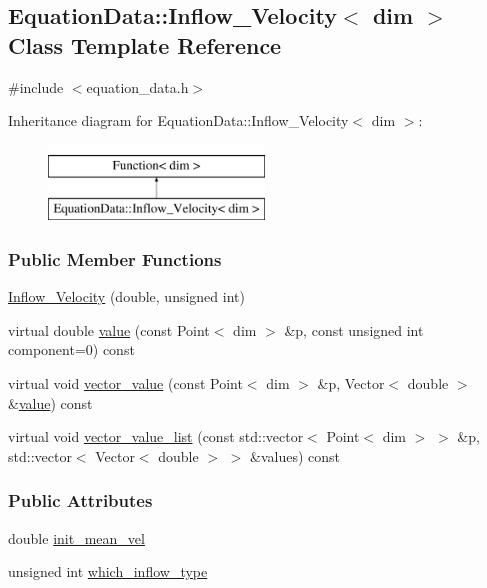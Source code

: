 \hypertarget{class_equation_data_1_1_inflow___velocity}{}\subsection{Equation\+Data\+:\+:Inflow\+\_\+\+Velocity$<$ dim $>$ Class Template Reference}
\label{class_equation_data_1_1_inflow___velocity}


{\ttfamily \#include $<$equation\+\_\+data.\+h$>$}

Inheritance diagram for Equation\+Data\+:\+:Inflow\+\_\+\+Velocity$<$ dim $>$\+:\begin{figure}[H]
\begin{center}
\leavevmode
\includegraphics[height=2.000000cm]{class_equation_data_1_1_inflow___velocity}
\end{center}
\end{figure}
\subsubsection*{Public Member Functions}
\begin{DoxyCompactItemize}
\item 
\hyperlink{class_equation_data_1_1_inflow___velocity_ac5035db1e557027579fd3b3c0220c671}{Inflow\+\_\+\+Velocity} (double, unsigned int)
\item 
virtual double \hyperlink{class_equation_data_1_1_inflow___velocity_a986662426fb6b3685ced24ce676a6ac4}{value} (const Point$<$ dim $>$ \&p, const unsigned int component=0) const 
\item 
virtual void \hyperlink{class_equation_data_1_1_inflow___velocity_aad33ff25f7b8e2260cb40311d0b15aa6}{vector\+\_\+value} (const Point$<$ dim $>$ \&p, Vector$<$ double $>$ \&\hyperlink{class_equation_data_1_1_inflow___velocity_a986662426fb6b3685ced24ce676a6ac4}{value}) const 
\item 
virtual void \hyperlink{class_equation_data_1_1_inflow___velocity_a777730a2849272dfa7b3acb5cd83106f}{vector\+\_\+value\+\_\+list} (const std\+::vector$<$ Point$<$ dim $>$ $>$ \&p, std\+::vector$<$ Vector$<$ double $>$ $>$ \&values) const 
\end{DoxyCompactItemize}
\subsubsection*{Public Attributes}
\begin{DoxyCompactItemize}
\item 
double \hyperlink{class_equation_data_1_1_inflow___velocity_a00fdc2d87172dbf05e274529d53e4874}{init\+\_\+mean\+\_\+vel}
\item 
unsigned int \hyperlink{class_equation_data_1_1_inflow___velocity_affb59b1d9b0d574a0aec58652b6dff88}{which\+\_\+inflow\+\_\+type}
\end{DoxyCompactItemize}


